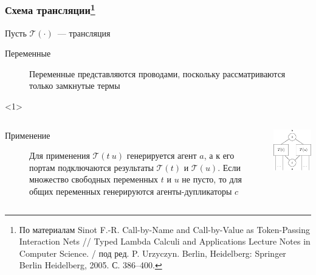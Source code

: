 \documentclass
  [ russian
  , aspectratio=169 %
  ] {beamer}
\begin{document}
\begin{frame}
    \frametitle{Схема трансляции\footnote[frame]{По материалам Sinot F.-R. Call-by-Name and Call-by-Value as Token-Passing Interaction Nets // Typed Lambda Calculi and Applications Lecture Notes in Computer Science. / под ред. P. Urzyczyn. Berlin, Heidelberg: Springer Berlin Heidelberg, 2005. С. 386–400.}}

    Пусть $\mathcal{T}(\cdot)$~--- трансляция

    \begin{description}
        \item[Переменные] Переменные представляются проводами, поскольку рассматриваются только замкнутые термы

    \end{description}
    \begin{onlyenv}<1>
        \begin{columns}[totalwidth=\textwidth]
            \begin{column}{0.6\linewidth}
                \begin{description}
                    \item[Применение] Для применения $\mathcal{T}(t\ u)$ генерируется агент $a$, а к его портам подключаются результаты $\mathcal{T}(t)$ и $\mathcal{T}(u)$.
                          Если множество свободных переменных $t$ и $u$ не пусто, то для общих переменных генерируются агенты-дупликаторы $c$
                \end{description}
            \end{column}
            \begin{column}{0.4\linewidth}
                \begin{center}
                    \includegraphics[width=0.5\linewidth]{figures/sinot_app.pdf}
                \end{center}
            \end{column}
        \end{columns}
    \end{onlyenv}


\end{frame}
\end{document}
